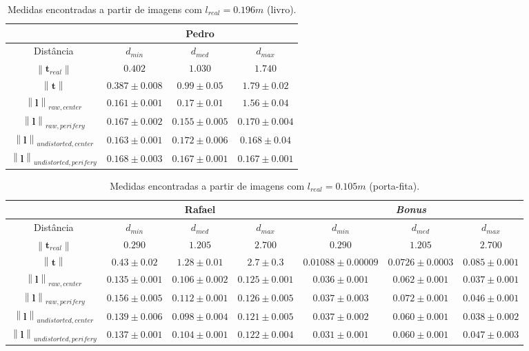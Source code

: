 \documentclass{bmvc2k}
\newcommand{\norm}[1]{\left\lVert#1\right\rVert}
\begin{document}
\begin{table}[htb]
 \footnotesize
\caption{Medidas encontradas a partir de imagens com $l_{real}=0.196m$ (livro).}
\label{table:medidasP}
\centering
\begin{tabular}{| c | c | c | c |}
\hline
 & \multicolumn{3}{|c|}{Pedro} \\
\hline
Distância & $d_{min}$ & $d_{med}$ & $d_{max}$\\
\hline
$\norm{\bm{t}_{real}}$ & $0.402$ & $1.030$ & $1.740$ \\
$\norm{\bm{t}}$ & $0.387 \pm 0.008$ & $0.99 \pm 0.05$ & $1.79 \pm 0.02$ \\
\hline
$\norm{\bm{l}}_{raw, center}$ & $0.161 \pm 0.001$ & $0.17 \pm 0.01$ & $1.56 \pm 0.04$ \\
$\norm{\bm{l}}_{raw, perifery}$ & $0.167 \pm 0.002$ & $0.155 \pm 0.005$ & $0.170 \pm 0.004$ \\
$\norm{\bm{l}}_{undistorted, center}$ &$0.163 \pm 0.001$ & $0.172
\pm 0.006$ & $0.168 \pm 0.04$ \\
$\norm{\bm{l}}_{undistorted, perifery}$ & $0.168 \pm 0.003$ & $0.167 \pm 0.001$ & $0.167 \pm 0.001$ \\
\hline
\end{tabular}
\end{table}

\begin{table}[htb]
 \tiny
\caption{Medidas encontradas a partir de imagens com $l_{real}=0.105m$ (porta-fita).}
\label{table:medidasR}
\centering
\tabcolsep=0.11cm
\begin{tabular}{| c | c | c | c | c | c | c |}
\hline
 & \multicolumn{3}{|c|}{Rafael} & \multicolumn{3}{|c|}{\textit{Bonus}} \\
\hline
 Distância & $d_{min}$ & $d_{med}$ & $d_{max}$ & $d_{min}$ & $d_{med}$ & $d_{max}$\\
 \hline
$\norm{\bm{t}_{real}}$ & $0.290$ & $1.205$ & $2.700$  & $0.290$ & $1.205$ & $2.700$ \\
$\norm{\bm{t}}$ & $0.43 \pm 0.02$ & $1.28 \pm 0.01$ & $2.7 \pm 0.3$ & $0.01088 \pm 0.00009$ & $0.0726 \pm 0.0003$ & $0.085 \pm 0.001$ \\
\hline
$\norm{\bm{l}}_{raw, center}$ & $0.135 \pm 0.001$ & $0.106 \pm 0.002$ & $0.125 \pm 0.001$ & $0.036 \pm 0.001$ & $0.062 \pm 0.001$ & $0.037 \pm 0.001$ \\
$\norm{\bm{l}}_{raw, perifery}$ & $0.156 \pm 0.005$ & $0.112 \pm 0.001$ & $0.126 \pm 0.005$ & $0.037 \pm 0.003$ & $0.072 \pm 0.001$ & $0.046 \pm 0.001$ \\
$\norm{\bm{l}}_{undistorted, center}$ &$0.139 \pm 0.006$ & $0.098
\pm 0.004$ & $0.121 \pm 0.005$ &$0.037 \pm 0.002$ & $0.060
\pm 0.001$ & $0.038 \pm 0.002$ \\
$\norm{\bm{l}}_{undistorted, perifery}$ & $0.137 \pm 0.001$ & $0.104 \pm 0.001$ & $0.122 \pm 0.004$ & $0.031 \pm 0.001$ & $0.060 \pm 0.001$ & $0.047 \pm 0.003$ \\
\hline
\end{tabular}
\end{table}
\end{document}
